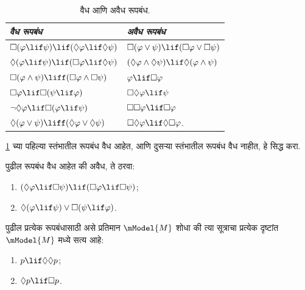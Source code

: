 \begin{table}[t]
    \centering
    \begin{tabular}{| l || l |}
      \hline
      {\emph{वैध रूपबंध}} & {\emph{अवैध रूपबंध}} \\
      \hline\hline
      $\Box(\varphi \lif \psi) \lif (\Diamond \varphi \lif \Diamond \psi)$
      & $\Box (\varphi \lor \psi) \lif (\Box \varphi \lor \Box \psi)$ \\
      $\Diamond (\varphi \lif \psi) \lif (\Box \varphi \lif \Diamond
      \psi)$
      & $(\Diamond \varphi \land \Diamond \psi) \lif \Diamond (\varphi
      \land \psi)$\\
      $\Box (\varphi \land \psi) \liff (\Box \varphi \land \Box \psi)$
      & $\varphi \lif \Box \varphi$ \\
      $\Box \varphi \lif \Box (\psi \lif \varphi)$
      & $\Box \Diamond \varphi \lif \psi$ \\
      $\lnot \Diamond \varphi \lif \Box (\varphi \lif \psi)$
      & $\Box \Box \varphi \lif \Box \varphi$ \\
      $\Diamond (\varphi \lor \psi) \liff (\Diamond \varphi \lor
      \Diamond \psi)$
      & $\Box \Diamond \varphi \lif \Diamond \Box \varphi$. \\
      \hline
    \end{tabular}
    \caption{वैध आणि अवैध रूपबंध.}
    \label{nml:syn:sch:tab:valid-invalidSchemas}
\end{table}

\begin{prob}
  \ref{nml:syn:sch:tab:valid-invalidSchemas} च्या
  पहिल्या स्तंभातील रूपबंध वैध आहेत, आणि दुसऱ्या
  स्तंभातील रूपबंध वैध नाहीत, हे सिद्ध करा.
\end{prob}

\begin{prob}
  पुढील रूपबंध वैध आहेत की अवैध, ते ठरवा:
  \begin{enumerate}
  \item $(\Diamond \varphi \lif \Box \psi) \lif (\Box \varphi \lif \Box
    \psi)$;
  \item $\Diamond(\varphi \lif \psi) \lor \Box(\psi \lif \varphi)$.
  \end{enumerate}
\end{prob}

\begin{prob}
  पुढील प्रत्येक रूपबंधासाठी असे प्रतिमान $\mModel{M}$ शोधा की
  त्या सूत्राचा प्रत्येक दृष्टांत $\mModel{M}$ मध्ये सत्य आहे:
  \begin{enumerate}
  \item $p \lif \Diamond\Diamond p$;
  \item $\Diamond p \lif \Box p$.
  \end{enumerate}
\end{prob}












